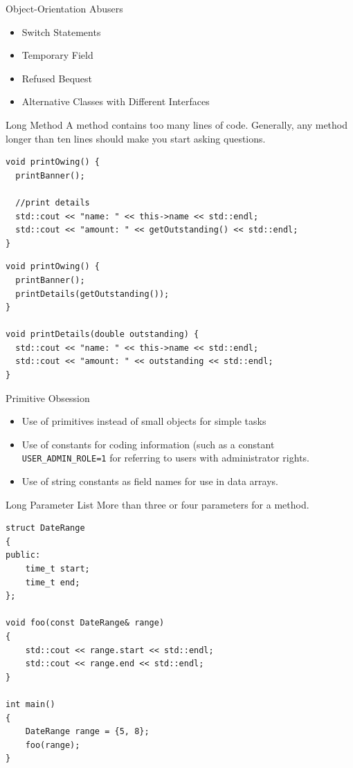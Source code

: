 \documentclass{beamer}
\begin{document}
\begin{frame}{Object-Orientation Abusers}
\begin{itemize}
  \item Switch Statements
  \item Temporary Field
  \item Refused Bequest
  \item Alternative Classes with Different Interfaces
\end{itemize}
\end{frame}

\begin{frame}[fragile]{Long Method}
A method contains too many lines of code. Generally, any method longer than ten
lines should make you start asking questions.

\begin{lstlisting}
void printOwing() {
  printBanner();

  //print details
  std::cout << "name: " << this->name << std::endl;
  std::cout << "amount: " << getOutstanding() << std::endl;
}
\end{lstlisting}

\begin{lstlisting}
void printOwing() {
  printBanner();
  printDetails(getOutstanding());
}

void printDetails(double outstanding) {
  std::cout << "name: " << this->name << std::endl;
  std::cout << "amount: " << outstanding << std::endl;
}
\end{lstlisting}
\end{frame}

\begin{frame}{Primitive Obsession}
\begin{itemize}
  \item Use of primitives instead of small objects for simple tasks
  \item Use of constants for coding information (such as a constant
  \lstinline{USER_ADMIN_ROLE=1} for referring to users with administrator
  rights.
  \item Use of string constants as field names for use in data arrays.
\end{itemize}
\end{frame}

\begin{frame}[fragile]{Long Parameter List}
More than three or four parameters for a method.
\begin{lstlisting}
struct DateRange
{
public:
    time_t start;
    time_t end;
};

void foo(const DateRange& range)
{
    std::cout << range.start << std::endl;
    std::cout << range.end << std::endl;
}

int main()
{
    DateRange range = {5, 8};
    foo(range);
}
\end{lstlisting}
\end{frame}
\end{document}
